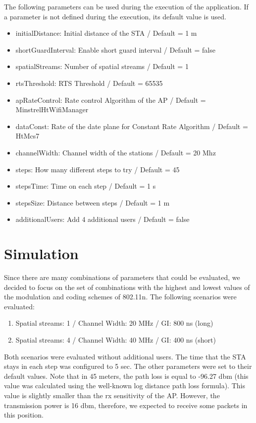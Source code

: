 \documentclass[12]{article}
\begin{document}
The following parameters can be used during the execution of the application. If a parameter is not defined during the execution, its default value is used.

\begin{itemize}
 \item initialDistance: Initial distance of the STA / Default = 1 m
 \item shortGuardInterval: Enable short guard interval / Default = false
 \item spatialStreams: Number of spatial streams / Default = 1
 \item rtsThreshold: RTS Threshold / Default = 65535
 \item apRateControl: Rate control Algorithm of the AP / Default = MinstrelHtWifiManager
 \item dataConst: Rate of the date plane for Constant Rate Algorithm / Default = HtMcs7
 \item channelWidth: Channel width of the stations / Default = 20 Mhz
 \item steps: How many different steps to try / Default = 45
 \item stepsTime: Time on each step / Default = 1 s
 \item stepsSize: Distance between steps / Default = 1 m
 \item additionalUsers: Add 4 additional users / Default = false
\end{itemize}

\section{Simulation}
Since there are many combinations of parameters that could be evaluated, we decided to focus on the set of combinations with the highest and lowest values of the modulation and coding schemes of 802.11n. The following scenarios were evaluated:

\begin{enumerate}
 \item Spatial streams: 1 / Channel Width: 20 MHz / GI: 800 ns (long)
 \item Spatial streams: 4 / Channel Width: 40 MHz / GI: 400 ns (short)
\end{enumerate}

Both scenarios were evaluated without additional users. The time that the STA stays in each step was configured to 5 sec. The other parameters were set to their default values. Note that in 45 meters, the path loss is equal to -96.27 dbm (this value was calculated using the well-known log distance path loss formula). This value is slightly smaller than the rx sensitivity of the AP. However, the transmission power is 16 dbm, therefore, we expected to receive some packets in this position.\\
\end{document}
